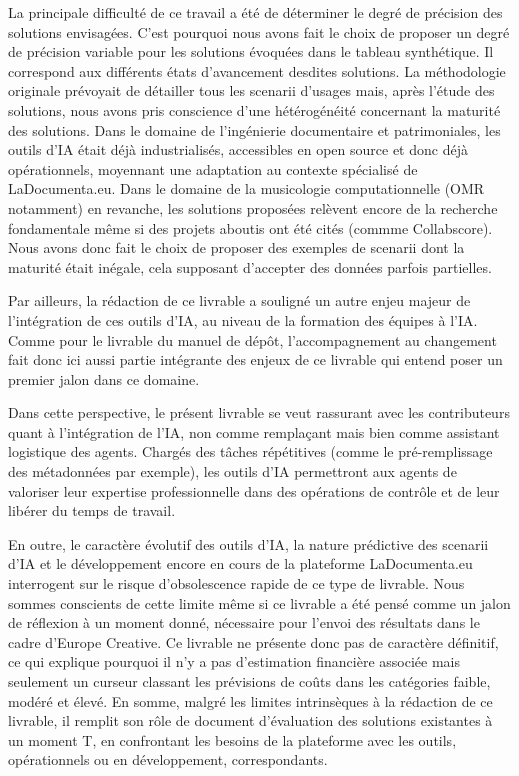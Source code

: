 La principale difficulté de ce travail a été de déterminer le degré de précision des solutions envisagées. 
C'est pourquoi nous avons fait le choix de proposer un degré de précision variable pour les solutions évoquées dans le tableau synthétique. Il correspond aux différents états d'avancement desdites solutions. 
La méthodologie originale prévoyait de détailler tous les scenarii d'usages mais, après l'étude des solutions, nous avons pris conscience d'une hétérogénéité concernant la maturité des solutions. 
Dans le domaine de l'ingénierie documentaire et patrimoniales, les outils d'IA était déjà industrialisés, accessibles en open source et donc déjà opérationnels, moyennant une adaptation au contexte spécialisé de LaDocumenta.eu. Dans le domaine de la musicologie computationnelle (OMR notamment) en revanche, les solutions proposées relèvent encore de la recherche fondamentale même si des projets aboutis ont été cités (commme Collabscore). Nous avons donc fait le choix de proposer des exemples de scenarii dont la maturité était inégale, cela supposant d'accepter des données parfois partielles. 

Par ailleurs, la rédaction de ce livrable a souligné un autre enjeu majeur de l'intégration de ces outils d'IA, au niveau de la formation des équipes à l'IA. Comme pour le livrable du manuel de dépôt,  l'accompagnement au changement fait donc ici aussi partie intégrante des enjeux de ce livrable qui entend poser un premier jalon dans ce domaine. 

Dans cette perspective, le présent livrable se veut rassurant avec les contributeurs quant à l'intégration de l'IA, non comme remplaçant mais bien comme assistant logistique des agents. Chargés des tâches répétitives (comme le pré-remplissage des métadonnées par exemple), les outils d'IA permettront aux agents de valoriser leur expertise professionnelle dans des opérations de contrôle et de leur libérer du temps de travail.


En outre, le caractère évolutif des outils d'IA, la nature prédictive des scenarii d'IA et le développement encore en cours de la plateforme LaDocumenta.eu interrogent sur le risque d'obsolescence rapide de ce type de livrable. Nous sommes conscients de cette limite même si ce livrable a été pensé comme un jalon de réflexion à un moment donné, nécessaire pour l'envoi des résultats dans le cadre d'Europe Creative. Ce livrable ne présente donc pas de caractère définitif, ce qui explique pourquoi il n'y a pas d'estimation financière associée mais seulement un curseur classant les prévisions de coûts dans les catégories faible, modéré et élevé.
En somme, malgré les limites intrinsèques à la rédaction de ce livrable, il remplit son rôle de document d'évaluation des solutions existantes à un moment T, en confrontant les besoins de la plateforme avec les outils, opérationnels ou en développement, correspondants. 


